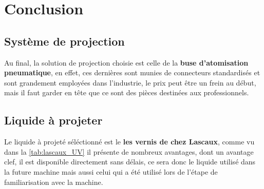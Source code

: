 \section{Conclusion}\label{sec:conclusion_etat_art}
\subsection{Système de projection}
Au final, la solution de projection choisie est celle de la \textbf{buse d'atomisation pneumatique}, en effet, ces dernières sont
munies de connecteurs standardisés et sont grandement employées dans l'industrie, le prix peut être un frein au début, mais il faut
garder en tête que ce sont des pièces destinées aux professionnels.

\subsection{Liquide à projeter}
Le liquide à projeté séléctionné est le \textbf{les vernis de chez Lascaux}, comme vu dans la \autoref{tab:lascaux_UV} il présente de nombreux avantages, dont
un avantage clef, il est disponible directement sans délais, ce sera donc le liquide utilisé dans la future machine mais aussi celui qui a été utilisé lors de
l'étape de familiarisation avec la machine.